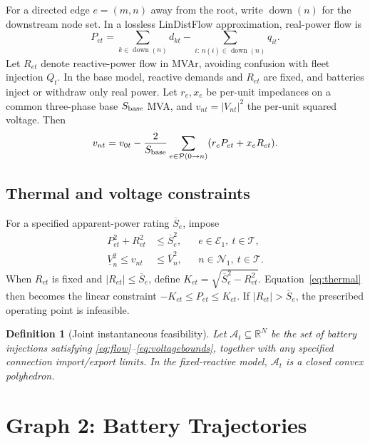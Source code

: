 \documentclass[11pt]{article}
\newtheorem{definition}[assumption]{Definition}
\theoremstyle{remark}
\newcommand{\R}{\mathbb R}
\newcommand{\T}{\mathcal T}
\begin{document}
For a directed edge $e=(m,n)$ away from the root, write
$\operatorname{down}(n)$ for the downstream node set. In a lossless
LinDistFlow approximation, real-power flow is
\begin{equation}
 P_{et}=\sum_{k\in\operatorname{down}(n)}d_{kt}
       -\sum_{i:\,n(i)\in\operatorname{down}(n)}q_{it}.
 \label{eq:flow}
\end{equation}
Let $R_{et}$ denote reactive-power flow in MVAr, avoiding confusion with fleet
injection $Q_t$. In the base model, reactive demands and $R_{et}$ are fixed,
and batteries inject or withdraw only real power. Let $r_e,x_e$ be
per-unit impedances on a common three-phase base $S_{\rm base}$ MVA, and
$v_{nt}=|V_{nt}|^2$ the per-unit squared voltage. Then
\begin{equation}
 v_{nt}=v_{0t}-\frac{2}{S_{\rm base}}
 \sum_{e\in\mathcal P(0\to n)}(r_eP_{et}+x_eR_{et}).
 \label{eq:voltage}
\end{equation}

\subsection{Thermal and voltage constraints}
For a specified apparent-power rating $\overline S_e$, impose
\begin{align}
 P_{et}^2+R_{et}^2&\le\overline S_e^2,
 &&e\in\mathcal E_1,\ t\in\T, \label{eq:thermal}\\
 \underline V_n^2\le v_{nt}&\le\overline V_n^2,
 &&n\in\mathcal N_1,\ t\in\T. \label{eq:voltagebounds}
\end{align}
When $R_{et}$ is fixed and $|R_{et}|\le\overline S_e$, define
$K_{et}=\sqrt{\overline S_e^2-R_{et}^2}$. Equation~\eqref{eq:thermal}
then becomes the linear constraint $-K_{et}\le P_{et}\le K_{et}$.
If $|R_{et}|>\overline S_e$, the prescribed operating point is infeasible.


\begin{definition}[Joint instantaneous feasibility]
Let $\mathcal A_t\subseteq\R^N$ be the set of battery injections satisfying
\eqref{eq:flow}--\eqref{eq:voltagebounds}, together with any specified
connection import/export limits. In the fixed-reactive model,
$\mathcal A_t$ is a closed convex polyhedron.
\end{definition}


\section{Graph 2: Battery Trajectories}
\label{sec:g2}
\end{document}
